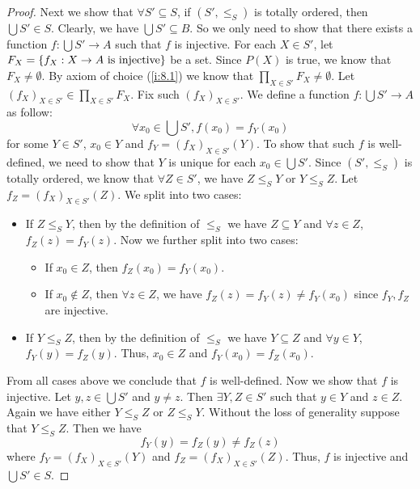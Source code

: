 \begin{proof}
  Next we show that \(\forall S' \subseteq S\), if \((S', \leq_S)\) is totally ordered, then \(\bigcup S' \in S\).
  Clearly, we have \(\bigcup S' \subseteq B\).
  So we only need to show that there exists a function \(f : \bigcup S' \to A\) such that \(f\) is injective.
  For each \(X \in S'\), let \(F_X = \left\lbrace f_X : X \to A \text{ is injective}\right\rbrace\) be a set.
  Since \(P(X)\) is true, we know that \(F_X \neq \emptyset\).
  By axiom of choice (\cref{i:8.1}) we know that \(\prod_{X \in S'} F_X \neq \emptyset\).
  Let \((f_X)_{X \in S'} \in \prod_{X \in S'} F_X\).
  Fix such \((f_X)_{X \in S'}\).
  We define a function \(f : \bigcup S' \to A\) as follow:
  \[
    \forall x_0 \in \bigcup S', f(x_0) = f_Y(x_0)
  \]
  for some \(Y \in S'\), \(x_0 \in Y\) and \(f_Y = (f_X)_{X \in S'}(Y)\).
  To show that such \(f\) is well-defined, we need to show that \(Y\) is unique for each \(x_0 \in \bigcup S'\).
  Since \((S', \leq_S)\) is totally ordered, we know that \(\forall Z \in S'\), we have \(Z \leq_S Y\) or \(Y \leq_S Z\).
  Let \(f_Z = (f_X)_{X \in S'}(Z)\).
  We split into two cases:
  \begin{itemize}
    \item If \(Z \leq_S Y\), then by the definition of \(\leq_S\) we have \(Z \subseteq Y\) and \(\forall z \in Z\), \(f_Z(z) = f_Y(z)\).
          Now we further split into two cases:
          \begin{itemize}
            \item If \(x_0 \in Z\), then \(f_Z(x_0) = f_Y(x_0)\).
            \item If \(x_0 \notin Z\), then \(\forall z \in Z\), we have \(f_Z(z) = f_Y(z) \neq f_Y(x_0)\) since \(f_Y, f_Z\) are injective.
          \end{itemize}
    \item If \(Y \leq_S Z\), then by the definition of \(\leq_S\) we have \(Y \subseteq Z\) and \(\forall y \in Y\), \(f_Y(y) = f_Z(y)\).
          Thus, \(x_0 \in Z\) and \(f_Y(x_0) = f_Z(x_0)\).
  \end{itemize}
  From all cases above we conclude that \(f\) is well-defined.
  Now we show that \(f\) is injective.
  Let \(y, z \in \bigcup S'\) and \(y \neq z\).
  Then \(\exists Y, Z \in S'\) such that \(y \in Y\) and \(z \in Z\).
  Again we have either \(Y \leq_S Z\) or \(Z \leq_S Y\).
  Without the loss of generality suppose that \(Y \leq_S Z\).
  Then we have
  \[
    f_Y(y) = f_Z(y) \neq f_Z(z)
  \]
  where \(f_Y = (f_X)_{X \in S'}(Y)\) and \(f_Z = (f_X)_{X \in S'}(Z)\).
  Thus, \(f\) is injective and \(\bigcup S' \in S\).


\end{proof}
